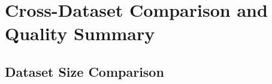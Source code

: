 \section{Cross-Dataset Comparison and Quality Summary}
\label{app:cross_dataset}

\vspace{1em}

\subsection{Dataset Size Comparison}

